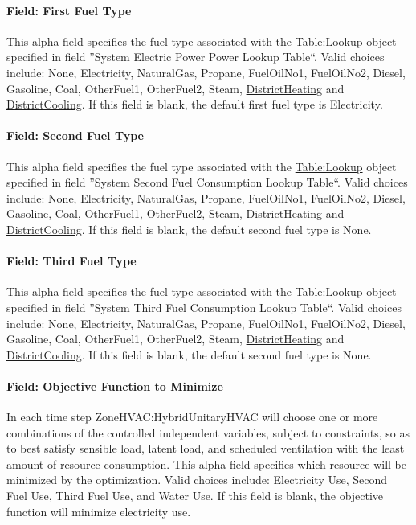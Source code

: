\paragraph{Field: First Fuel Type}
This alpha field specifies the fuel type associated with the \hyperref[tablelookup]{Table:Lookup} object specified in field ''System Electric Power Power Lookup Table``. Valid choices include: None, Electricity, NaturalGas, Propane, FuelOilNo1, FuelOilNo2, Diesel, Gasoline, Coal, OtherFuel1, OtherFuel2, Steam, \hyperref[districtheating]{DistrictHeating} and \hyperref[districtcooling]{DistrictCooling}. If this field is blank, the default first fuel type is Electricity.

\paragraph{Field: Second Fuel Type}
This alpha field specifies the fuel type associated with the \hyperref[tablelookup]{Table:Lookup} object specified in field ''System Second Fuel Consumption Lookup Table``. Valid choices include: None, Electricity, NaturalGas, Propane, FuelOilNo1, FuelOilNo2, Diesel, Gasoline, Coal, OtherFuel1, OtherFuel2, Steam, \hyperref[districtheating]{DistrictHeating} and \hyperref[districtcooling]{DistrictCooling}. If this field is blank, the default second fuel type is None.

\paragraph{Field: Third Fuel Type}
This alpha field specifies the fuel type associated with the \hyperref[tablelookup]{Table:Lookup} object specified in field ''System Third Fuel Consumption Lookup Table``. Valid choices include: None, Electricity, NaturalGas, Propane, FuelOilNo1, FuelOilNo2, Diesel, Gasoline, Coal, OtherFuel1, OtherFuel2, Steam, \hyperref[districtheating]{DistrictHeating} and \hyperref[districtcooling]{DistrictCooling}. If this field is blank, the default second fuel type is None.

\paragraph{Field: Objective Function to Minimize}
In each time step ZoneHVAC:HybridUnitaryHVAC will choose one or more combinations of the controlled independent variables, subject to constraints, so as to best satisfy sensible load, latent load, and scheduled ventilation with the least amount of resource consumption. This alpha field specifies which resource will be minimized by the optimization.  Valid choices include: Electricity Use, Second Fuel Use, Third Fuel Use, and Water Use.  If this field is blank, the objective function will minimize electricity use.


